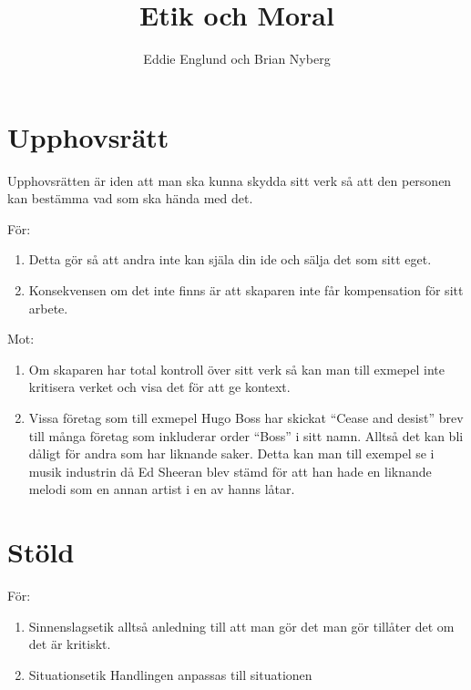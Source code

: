 \documentclass[12pt]{article}
\title{Etik och Moral}
\author{Eddie Englund och Brian Nyberg}
\begin{document}
    

    \maketitle

    \section{Upphovsrätt}

    Upphovsrätten är iden att man ska kunna skydda sitt verk så att den personen kan bestämma vad som ska hända med det.

    \vspace{1cm}

    För:

    \begin{enumerate}
        \item Detta gör så att andra inte kan själa din ide och sälja det som sitt eget.
        \item Konsekvensen om det inte finns är att skaparen inte får kompensation för sitt arbete.
    \end{enumerate}

    \vspace{1cm}

    Mot:

    \begin{enumerate}    
        \item Om skaparen  har total kontroll över sitt verk så kan man till exmepel inte kritisera verket och visa det för att ge kontext.
        \item Vissa företag som till exmepel Hugo Boss har skickat ``Cease and desist'' brev till många företag som inkluderar order ``Boss'' i sitt namn. Alltså det kan bli dåligt för andra som har liknande saker. Detta kan man till exempel se i musik industrin då Ed Sheeran blev stämd för att han hade en liknande melodi som en annan artist i en av hanns låtar.
    \end{enumerate}
    

    \section{Stöld}

  
    För:

    \begin{enumerate}
        
        \item Sinnenslagsetik alltså anledning till att man gör det man gör tillåter det om det är kritiskt.
        \item Situationsetik    Handlingen anpassas till situationen  
    \end{enumerate}
\end{document}
